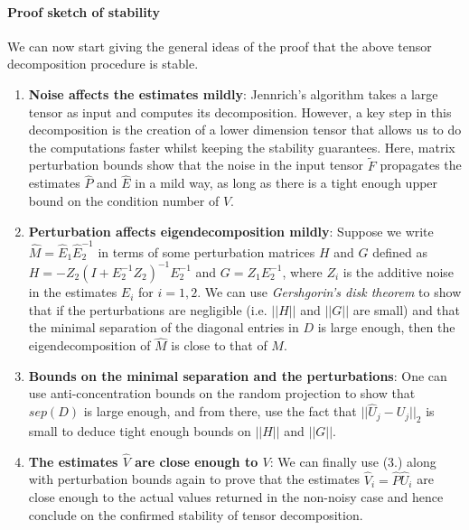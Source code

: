 \paragraph{Proof sketch of stability} We can now start giving the general ideas of the proof that the above tensor decomposition procedure is stable.
\begin{enumerate}
    \item {\bf Noise affects the estimates mildly}: Jennrich's algorithm takes a large tensor as input and computes its decomposition. However, a key step in this decomposition is the creation of a lower dimension tensor that allows us to do the computations faster whilst keeping the stability guarantees. Here, matrix perturbation bounds show that the noise in the input tensor $\widetilde{F}$ propagates the estimates $\widehat{P}$ and $\widehat{E}$ in a mild way, as long as there is a tight enough upper bound on the condition number of $V$.
    \item {\bf Perturbation affects eigendecomposition mildly}: Suppose we write $\widehat{M}=\widehat{E}_1\widehat{E}_2^{-1}$ in terms of some perturbation matrices $H$ and $G$ defined as $H=-Z_2(I+E_2^{-1}Z_2)^{-1}E_2^{-1}$ and $G=Z_1E_2^{-1}$, where $Z_i$ is the additive noise in the estimates $\widehat{E}_i$ for $i=1,2$. We can use \textit{Gershgorin's disk theorem} to show that if the perturbations are negligible (i.e. $||H||$ and $||G||$ are small) and that the minimal separation of the diagonal entries in $D$ is large enough, then the eigendecomposition of $\widehat{M}$ is close to that of $M$.
    \item {\bf Bounds on the minimal separation and the perturbations}: One can use anti-concentration bounds on the random projection to show that $sep(D)$ is large enough, and from there, use the fact that $||\widehat{U}_j-U_j||_2$ is small to deduce tight enough bounds on $||H||$ and $||G||$.
    \item {\bf The estimates $\widehat{V}$ are close enough to $V$}: We can finally use (3.) along with perturbation bounds again to prove that the estimates $\widehat{V}_i=\widehat{P}\widehat{U}_i$ are close enough to the actual values returned in the non-noisy case and hence conclude on the confirmed stability of tensor decomposition.
\end{enumerate}
